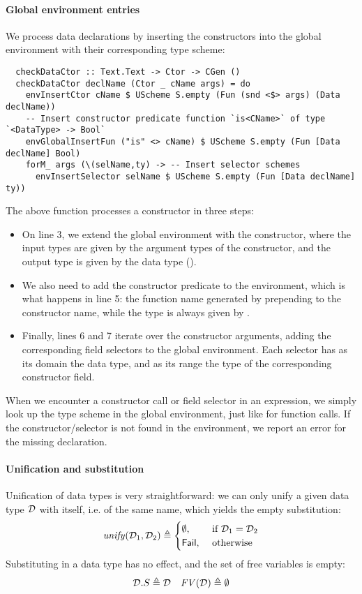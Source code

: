 \paragraph{Global environment entries}
We process data declarations by inserting the constructors into the global
environment with their corresponding type scheme:
\begin{verbatim}
  checkDataCtor :: Text.Text -> Ctor -> CGen ()
  checkDataCtor declName (Ctor _ cName args) = do
    envInsertCtor cName $ UScheme S.empty (Fun (snd <$> args) (Data declName))
    -- Insert constructor predicate function `is<CName>` of type `<DataType> -> Bool`
    envGlobalInsertFun ("is" <> cName) $ UScheme S.empty (Fun [Data declName] Bool)
    forM_ args (\(selName,ty) -> -- Insert selector schemes
      envInsertSelector selName $ UScheme S.empty (Fun [Data declName] ty))
\end{verbatim}
%
The above function processes a constructor  in three steps:
\begin{itemize}
  \item On line 3, we extend the global environment with the constructor, where
        the input types are given by the argument types of the constructor, and
        the output type is given by the data type ().
  \item We also need to add the constructor predicate to the environment, which
        is what happens in line 5: the function name generated by prepending
         to the constructor name, while the type is always given
        by .
  \item Finally, lines 6 and 7 iterate over the constructor arguments, adding
        the corresponding field selectors to the global environment. Each
        selector has as its domain the data type, and as its range the type of
        the corresponding constructor field.
\end{itemize}

When we encounter a constructor call or field selector in an expression, we
simply look up the type scheme in the global environment, just like for function
calls. If the constructor/selector is not found in the environment, we report an
error for the missing declaration.

\paragraph{Unification and substitution}
Unification of data types is very straightforward: we can only unify a given
data type $\mathcal{D}$ with itself, i.e. of the same name, which yields the empty substitution:
\[ \mathit{unify}(\mathcal{D}_1, \mathcal{D}_2) \triangleq
    \begin{cases}
      \emptyset , & \text{ if } \mathcal{D}_1 = \mathcal{D}_2 \\
      \mathsf{Fail} , & \text{ otherwise}
    \end{cases} \]
%
Substituting in a data type has no effect, and the set of free variables is empty:
\begin{align*}
  \mathcal{D}.S \triangleq \mathcal{D} && \mathit{FV}(\mathcal{D}) \triangleq \emptyset
\end{align*}


